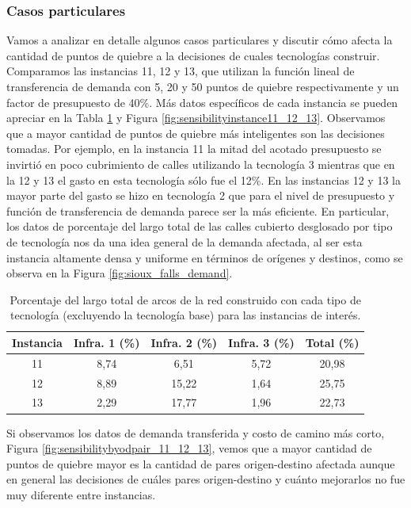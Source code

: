 \documentclass{article}
\begin{document}
  \FloatBarrier
  \subsubsection*{Casos particulares}

  Vamos a analizar en detalle algunos casos particulares y discutir cómo afecta la cantidad de puntos de quiebre a la decisiones de cuales tecnologías construir. Comparamos las instancias 11, 12 y 13, que utilizan la función lineal de transferencia de demanda con 5, 20 y 50 puntos de quiebre respectivamente y un factor de presupuesto de 40\%. Más datos específicos de cada instancia se pueden apreciar en la Tabla \ref{table:sensibilityinfralengths} y Figura \ref{fig:sensibilityinstance11_12_13}. Observamos que a mayor cantidad de puntos de quiebre más inteligentes son las decisiones tomadas. Por ejemplo, en la instancia 11 la mitad del acotado presupuesto se invirtió en poco cubrimiento de calles utilizando la tecnología 3 mientras que en la 12 y 13 el gasto en esta tecnología sólo fue el 12\%. En las instancias 12 y 13 la mayor parte del gasto se hizo en tecnología 2 que para el nivel de presupuesto y función de transferencia de demanda parece ser la más eficiente. En particular, los datos de porcentaje del largo total de las calles cubierto desglosado por tipo de tecnología nos da una idea general de la demanda afectada, al ser esta instancia altamente densa y uniforme en términos de orígenes y destinos, como se observa en la Figura \ref{fig:sioux_falls_demand}.

   \begin{table}[h!]
    \centering
    \begin{tabular}{ccccc}
      \toprule
        Instancia & Infra. 1 (\%) & Infra. 2 (\%) & Infra. 3 (\%) & Total (\%) \\
      \midrule
        11 & 8,74  & 6,51   & 5,72 & 20,98 \\
        12 & 8,89  & 15,22  & 1,64 & 25,75 \\
        13 & 2,29  & 17,77  & 1,96 & 22,73 \\
      \bottomrule
    \end{tabular}
    \caption{Porcentaje del largo total de arcos de la red construido con cada tipo de tecnología (excluyendo la tecnología base) para las instancias de interés.}\label{table:sensibilityinfralengths}
  \end{table}

 Si observamos los datos de demanda transferida y costo de camino más corto, Figura \ref{fig:sensibilitybyodpair_11_12_13}, vemos que a mayor cantidad de puntos de quiebre mayor es la cantidad de pares origen-destino afectada aunque en general las decisiones de cuáles pares origen-destino y cuánto mejorarlos no fue muy diferente entre instancias.
\end{document}
